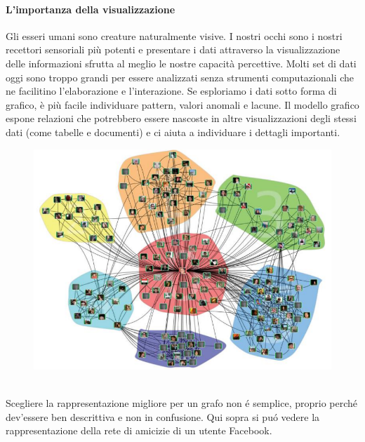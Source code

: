 \paragraph{L'importanza della visualizzazione} Gli esseri umani sono creature naturalmente visive. I nostri occhi sono i nostri recettori sensoriali più potenti e presentare i dati attraverso la visualizzazione delle informazioni sfrutta al meglio le nostre capacità percettive. Molti set di dati oggi sono troppo grandi per essere analizzati senza strumenti computazionali che ne facilitino l'elaborazione e l'interazione. Se esploriamo i dati sotto forma di grafico, è più facile individuare pattern, valori anomali e lacune. Il modello grafico espone relazioni che potrebbero essere nascoste in altre visualizzazioni degli stessi dati (come tabelle e documenti) e ci aiuta a individuare i dettagli importanti. 
\\
\begin{figure}[th]
    \centering
    \includegraphics[width=0.5\linewidth]{ML&Graphs//img/esempiovisualiz.png}
\end{figure}
\\
Scegliere la rappresentazione migliore per un grafo non é semplice, proprio perché dev'essere ben descrittiva e non in confusione. Qui sopra si puó vedere la rappresentazione della rete di amicizie di un utente Facebook.
